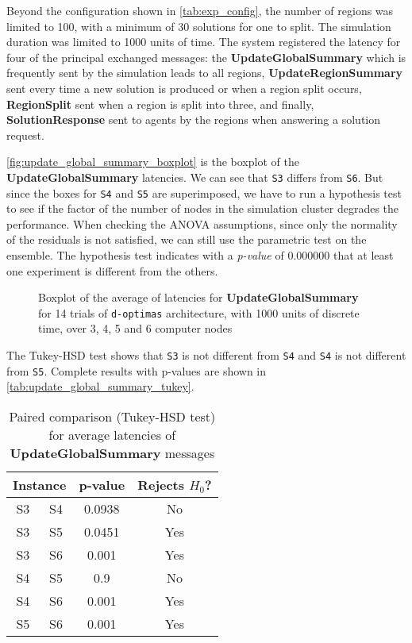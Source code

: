 \documentclass[preprint,12pt]{elsarticle}
\begin{document}
Beyond the configuration shown in \autoref{tab:exp_config}, the number of regions was limited to 100, with a minimum of 30 solutions for one to split. The simulation duration was limited to 1000 units of time. The system registered the latency for four of the principal exchanged messages: the \textbf{UpdateGlobalSummary} which is frequently sent by the simulation leads to all regions, \textbf{UpdateRegionSummary} sent every time a new solution is produced or when a region split occurs, \textbf{RegionSplit} sent when a region is split into three, and finally, \textbf{SolutionResponse} sent to agents by the regions when answering a solution request. 


\autoref{fig:update_global_summary_boxplot} is the boxplot of the \textbf{UpdateGlobalSummary} latencies. We can see that \texttt{S3} differs from \texttt{S6}. But since the boxes for \texttt{S4} and \texttt{S5} are superimposed, we have to run a hypothesis test to see if the factor of the number of nodes in the simulation cluster degrades the performance. When checking the ANOVA assumptions, since only the normality of the residuals is not satisfied, we can still use the parametric test on the ensemble. The hypothesis test indicates with a \textit{p-value} of $0.000000$ that at least one experiment is different from the others.

\begin{figure}[ht!]
    \centering
    
    \caption{Boxplot of the average of latencies for \textbf{UpdateGlobalSummary} for 14 trials of \texttt{d-optimas} architecture, with 1000 units of discrete time, over 3, 4, 5 and 6 computer nodes}
    \label{fig:update_global_summary_boxplot}
\end{figure}

The Tukey-HSD test shows that \texttt{S3} is not different from \texttt{S4} and \texttt{S4} is not different from \texttt{S5}. Complete results with p-values are shown in \autoref{tab:update_global_summary_tukey}.

\begin{table}[ht!]
    \centering
    \caption{Paired comparison (Tukey-HSD test) for average latencies of \textbf{UpdateGlobalSummary} messages}
    \begin{tabular}{cccc}
    \toprule
    \multicolumn{2}{c}{\textbf{Instance}} & \textbf{p-value} & \textbf{Rejects $H_0$?}\\
    \midrule
    S3   &  S4  & 0.0938 &  No \\
    S3   &  S5  & 0.0451 &  Yes \\
    S3   &  S6  &  0.001 &  Yes \\
    S4   &  S5  &    0.9 &  No \\
    S4   &  S6  &  0.001 &  Yes \\
    S5   &  S6  &  0.001 &  Yes \\
    \bottomrule
    \end{tabular}
    \label{tab:update_global_summary_tukey}
\end{table}
\end{document}
